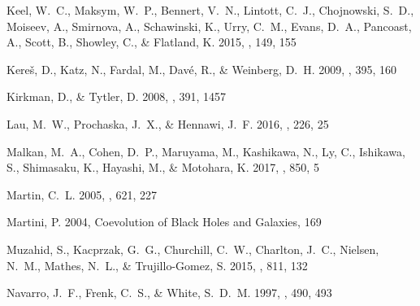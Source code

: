 \documentclass[iop]{emulateapj}
\begin{document}
\begin{thebibliography}{54}
{Keel}, W.~C., {Maksym}, W.~P., {Bennert}, V.~N., {Lintott}, C.~J.,
  {Chojnowski}, S.~D., {Moiseev}, A., {Smirnova}, A., {Schawinski}, K., {Urry},
  C.~M., {Evans}, D.~A., {Pancoast}, A., {Scott}, B., {Showley}, C., \&
  {Flatland}, K. 2015, \aj, 149, 155

{Kere\v{s}}, D., {Katz}, N., {Fardal}, M., {Dav{\'e}}, R., \& {Weinberg}, D.~H.
  2009, \mnras, 395, 160

{Kirkman}, D., \& {Tytler}, D. 2008, \mnras, 391, 1457

{Lau}, M.~W., {Prochaska}, J.~X., \& {Hennawi}, J.~F. 2016, \apjs, 226, 25

{Malkan}, M.~A., {Cohen}, D.~P., {Maruyama}, M., {Kashikawa}, N., {Ly}, C.,
  {Ishikawa}, S., {Shimasaku}, K., {Hayashi}, M., \& {Motohara}, K. 2017, \apj,
  850, 5

{Martin}, C.~L. 2005, \apj, 621, 227

{Martini}, P. 2004, Coevolution of Black Holes and Galaxies, 169

{Muzahid}, S., {Kacprzak}, G.~G., {Churchill}, C.~W., {Charlton}, J.~C.,
  {Nielsen}, N.~M., {Mathes}, N.~L., \& {Trujillo-Gomez}, S. 2015, \apj, 811,
  132

{Navarro}, J.~F., {Frenk}, C.~S., \& {White}, S.~D.~M. 1997, \apj, 490, 493


\end{thebibliography}
\end{document}
